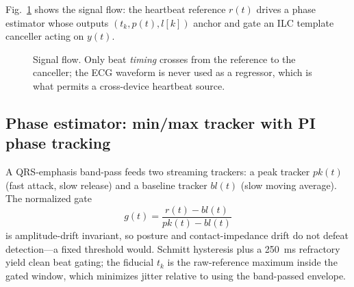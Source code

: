 \documentclass[conference]{IEEEtran}
\begin{document}
Fig.~\ref{fig:sys} shows the signal flow: the heartbeat reference $r(t)$ drives a phase estimator
whose outputs $(t_k,p(t),l[k])$ anchor and gate an ILC template canceller acting on $y(t)$.

\begin{figure}[t]
\centering
{}
\caption{Signal flow. Only beat \emph{timing} crosses from the reference to the canceller; the ECG
waveform is never used as a regressor, which is what permits a cross-device heartbeat source.}
\label{fig:sys}
\end{figure}

\subsection{Phase estimator: min/max tracker with PI phase tracking}
A QRS-emphasis band-pass feeds two streaming trackers: a peak tracker $pk(t)$ (fast attack, slow
release) and a baseline tracker $bl(t)$ (slow moving average). The normalized gate
\begin{equation}
g(t) = \frac{r(t) - bl(t)}{pk(t) - bl(t)}
\label{eq:gate}
\end{equation}
is amplitude-drift invariant, so posture and contact-impedance drift do not defeat detection---a
fixed threshold would. Schmitt hysteresis plus a 250~ms refractory yield clean beat gating; the
fiducial $t_k$ is the raw-reference maximum inside the gated window, which minimizes jitter relative
to using the band-passed envelope.
\end{document}
